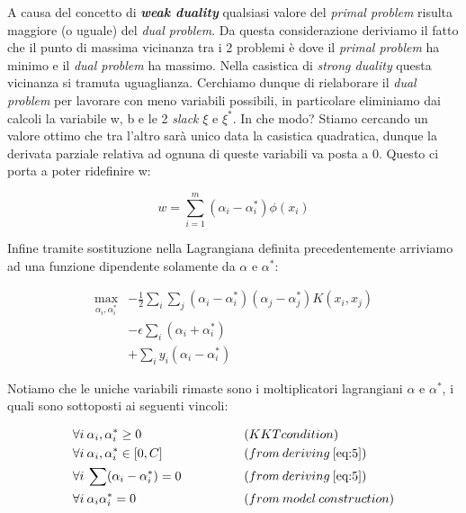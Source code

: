 \documentclass[12pt]{article}
\begin{document}
	A causa del concetto di \textbf{\textit{weak duality}} qualsiasi valore del \textit{primal problem} risulta maggiore (o uguale) del \textit{dual problem}. Da questa considerazione deriviamo il fatto che il punto di massima vicinanza tra i 2 problemi è dove il \textit{primal problem} ha minimo e il \textit{dual problem} ha massimo. Nella casistica di \textit{strong duality} questa vicinanza si tramuta uguaglianza.
Cerchiamo dunque di rielaborare il \textit{dual problem} per lavorare con meno variabili possibili, in particolare eliminiamo dai calcoli la variabile w, b e le 2 \textit{slack} $\xi$ e $\xi^*$. In che modo? Stiamo cercando un valore ottimo che tra l’altro sarà unico data la casistica quadratica, dunque la derivata parziale relativa ad ognuna di queste variabili va posta a 0. Questo ci porta a poter ridefinire w:

	\begin{equation}\label{eq:4}
		w = \sum_{i=1}^{m}(\alpha_i - \alpha_i^*)\phi(x_i)
	\end{equation}

	Infine tramite sostituzione nella Lagrangiana definita precedentemente arriviamo ad una funzione dipendente solamente da $\alpha$ e $\alpha^*$:

	\begin{equation}\label{eq:5}
	\begin{aligned}
		\max_{\alpha_i,\alpha_i^*} &- \frac{1}{2}\sum_i\sum_j(\alpha_i - \alpha_i^*)(\alpha_j - \alpha_j^*)K(x_i,x_j) \\
		&- \epsilon\sum_i(\alpha_i + \alpha_i^*)\\
		&+ \sum_i y_i(\alpha_i - \alpha_i^*)
	\end{aligned}
	\end{equation}

	Notiamo che le uniche variabili rimaste sono i moltiplicatori lagrangiani $\alpha$ e $\alpha^*$, i quali sono sottoposti ai seguenti vincoli:
	
	\begin{equation}\label{eq:6}
		\begin{aligned}
		&\forall i \: \alpha_i,\alpha_i^* \geq 0 \qquad\qquad &&(KKT condition) \\
		&\forall i \: \alpha_i,\alpha_i^* \in [0,C]  \qquad\qquad &&(from \: deriving \: \eqref{eq:5})\\
		&\forall i \: \sum (\alpha_i - \alpha_i^*) = 0 \qquad\qquad &&(from \: deriving \: \eqref{eq:5})\\
		&\forall i \: \alpha_i \alpha_i^* = 0 \qquad\qquad &&(from \: model \: construction)
		\end{aligned}
	\end{equation}
			
\end{document}
